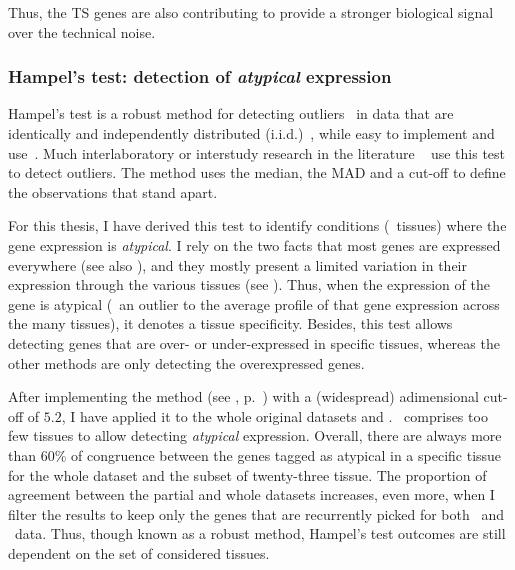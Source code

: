 Thus, the \gls{TS} genes are also contributing to provide a stronger
biological signal over the technical noise.

\subsubsection{Hampel's test: detection of \emph{atypical} expression}\label{subsub:Hampel}

Hampel's test is a robust method
for detecting outliers~
in data that are identically and independently distributed (i.i.d.)~,
while easy to implement and use~.
Much interlaboratory or interstudy research in the literature
\eg~\citet{LinsingerHampel,Lewczuk2006-wq,Rocke1983-qa,Apfalter1999-ca}
use this test to detect outliers.
The method uses the median, the \gls{MAD} and a cut-off
to define the observations that stand apart.

For this thesis, I have derived this test to identify conditions (\ie\ tissues)
where the gene expression is \emph{atypical}.
I rely on the two facts that
most genes are expressed everywhere 
(see also ),
and they mostly present a limited variation in their expression
through the various tissues (see ).
Thus, when the expression of the gene is atypical
(\ie\ an outlier to the average profile of that gene expression across the many tissues),
it denotes a tissue specificity.
Besides,
this test allows detecting genes that are over- or under-expressed in specific tissues,
whereas the other methods are only detecting the overexpressed genes.

After implementing the method (see , p.~\pageref{algo:hampel})
with a (widespread) adimensional cut-off of $5.2$, %
I have applied it to the whole original datasets and \setTwo.
\setOne\ comprises too few tissues to allow detecting \emph{atypical} expression.
Overall, there are always more than 60\% of congruence between the genes tagged
as atypical in a specific tissue for the whole dataset
and the subset of twenty-three tissue.
The proportion of agreement between the partial and whole datasets increases,
even more, when I filter the results to keep only the genes that are recurrently
picked for both \uhlen\ and \gtex\ data.
Thus, though known as a robust method,
Hampel's test outcomes are still dependent on the set of considered tissues.

